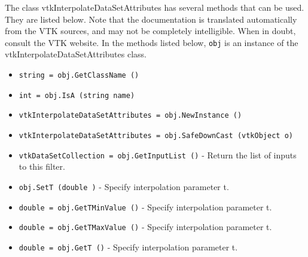 The class vtkInterpolateDataSetAttributes has several methods that can be used.
  They are listed below.
Note that the documentation is translated automatically from the VTK sources,
and may not be completely intelligible.  When in doubt, consult the VTK website.
In the methods listed below, \verb|obj| is an instance of the vtkInterpolateDataSetAttributes class.
\begin{itemize}
\item  \verb|string = obj.GetClassName ()|

\item  \verb|int = obj.IsA (string name)|

\item  \verb|vtkInterpolateDataSetAttributes = obj.NewInstance ()|

\item  \verb|vtkInterpolateDataSetAttributes = obj.SafeDownCast (vtkObject o)|

\item  \verb|vtkDataSetCollection = obj.GetInputList ()| -  Return the list of inputs to this filter.

\item  \verb|obj.SetT (double )| -  Specify interpolation parameter t.

\item  \verb|double = obj.GetTMinValue ()| -  Specify interpolation parameter t.

\item  \verb|double = obj.GetTMaxValue ()| -  Specify interpolation parameter t.

\item  \verb|double = obj.GetT ()| -  Specify interpolation parameter t.

\end{itemize}
